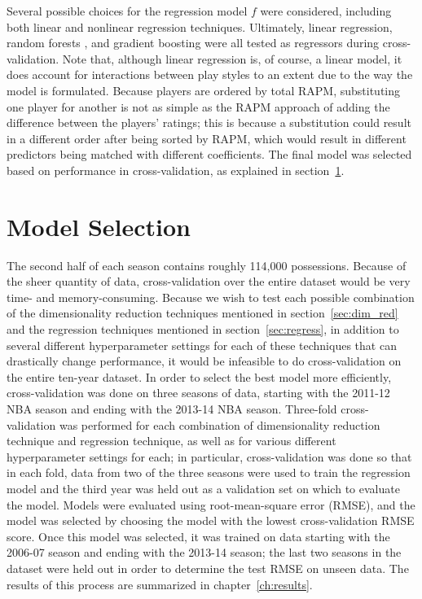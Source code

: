 Several possible choices for the regression model $f$ were considered, including
both linear and nonlinear regression techniques. Ultimately, linear regression,
random forests \cite{RF}, and gradient boosting \cite{GB} were all tested as
regressors during cross-validation. Note that, although linear regression is, of
course, a linear model, it does account for interactions between play styles to an
extent due to the way the model is formulated. Because players are ordered by total
RAPM, substituting one player for another is not as simple as the RAPM approach of
adding the difference between the players' ratings; this is because a substitution
could result in a different order after being sorted by RAPM, which would result in
different predictors being matched with different coefficients. The final model was
selected based on performance in cross-validation, as explained in
section~\ref{sec:mod_sel}.

\section{Model Selection}
\label{sec:mod_sel}

The second half of each season contains roughly 114,000 possessions. Because of the
sheer quantity of data, cross-validation over the entire dataset would be very time-
and memory-consuming. Because we wish to test each possible combination of the
dimensionality reduction techniques mentioned in section~\ref{sec:dim_red} and the
regression techniques mentioned in section~\ref{sec:regress}, in addition to several
different hyperparameter settings for each of these techniques that can drastically
change performance, it would be infeasible to do cross-validation on the entire
ten-year dataset. In order to select the best model more efficiently,
cross-validation was done on three seasons of data, starting with the 2011-12 NBA
season and ending with the 2013-14 NBA season.  Three-fold cross-validation was
performed for each combination of dimensionality reduction technique and regression
technique, as well as for various different hyperparameter settings for each; in
particular, cross-validation was done so that in each fold, data from two of the
three seasons were used to train the regression model and the third year was held
out as a validation set on which to evaluate the model. Models were evaluated using
root-mean-square error (RMSE), and the model was selected by choosing the model with
the lowest cross-validation RMSE score. Once this model was selected, it was trained
on data starting with the 2006-07 season and ending with the 2013-14 season; the
last two seasons in the dataset were held out in order to determine the test RMSE on
unseen data. The results of this process are summarized in chapter~\ref{ch:results}.
